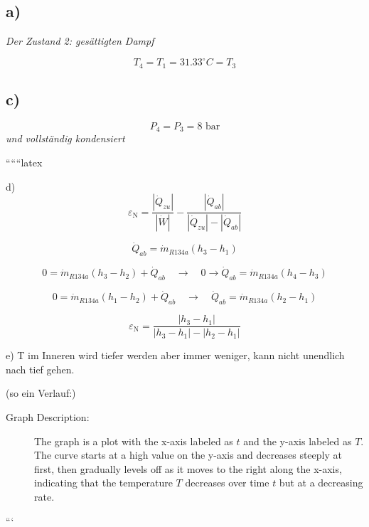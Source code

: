 \subsection*{a)}
\textit{Der Zustand 2: gesättigten Dampf}

\[ T_4 = T_1 = 31.33^\circ C = T_3 \]

\subsection*{c)}
\[ P_4 = P_3 = 8 \text{ bar} \]
\textit{und vollständig kondensiert}

``````latex


d) 
\[
\varepsilon_{\text{N}} = \frac{| \dot{Q}_{zu} |}{| \dot{W} |} - \frac{| \dot{Q}_{ab} |}{| \dot{Q}_{zu} | - | \dot{Q}_{ab} |}
\]

\[
\dot{Q}_{ab} = \dot{m}_{R134a} (h_3 - h_1)
\]

\[
0 = \dot{m}_{R134a} (h_3 - h_2) + \dot{Q}_{ab} \quad \rightarrow \quad 0 \rightarrow \dot{Q}_{ab} = \dot{m}_{R134a} (h_4 - h_3)
\]

\[
0 = \dot{m}_{R134a} (h_1 - h_2) + \dot{Q}_{ab} \quad \rightarrow \quad \dot{Q}_{ab} = \dot{m}_{R134a} (h_2 - h_1)
\]

\[
\varepsilon_{\text{N}} = \frac{| h_3 - h_1 |}{| h_3 - h_1 | - | h_2 - h_1 |}
\]

e) T im Inneren wird tiefer werden aber immer weniger, kann nicht unendlich nach tief gehen.

(so ein Verlauf:)

\begin{description}
    \item[Graph Description:] The graph is a plot with the x-axis labeled as $t$ and the y-axis labeled as $T$. The curve starts at a high value on the y-axis and decreases steeply at first, then gradually levels off as it moves to the right along the x-axis, indicating that the temperature $T$ decreases over time $t$ but at a decreasing rate.
\end{description}

```